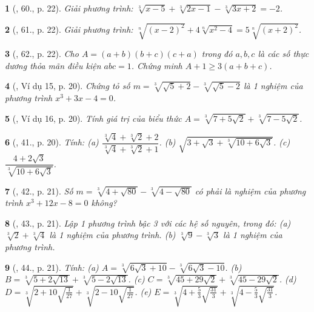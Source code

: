 \documentclass{article}
\newtheorem{baitoan}{}%
\begin{document}
\begin{baitoan}[\cite{Tuyen_Toan_9_old}, 60., p. 22]
	Giải phương trình: $\sqrt[3]{x - 5} + \sqrt[3]{2x - 1} - \sqrt[3]{3x + 2} = -2$.
\end{baitoan}

\begin{baitoan}[\cite{Tuyen_Toan_9_old}, 61., p. 22]
	Giải phương trình: $\sqrt[n]{(x - 2)^2} + 4\sqrt[n]{x^2 - 4} = 5\sqrt[n]{(x + 2)^2}$.
\end{baitoan}

\begin{baitoan}[\cite{Tuyen_Toan_9_old}, 62., p. 22]
	Cho $A = (a + b)(b + c)(c + a)$ trong đó $a,b,c$ là các số thực dương thỏa mãn điều kiện $abc = 1$. Chứng minh $A + 1\ge3(a + b + c)$.
\end{baitoan}

\begin{baitoan}[\cite{Binh_Toan_9_tap_1}, Ví dụ 15, p. 20]
	Chứng tỏ số $m = \sqrt[3]{\sqrt{5} + 2} - \sqrt[3]{\sqrt{5} - 2}$ là 1 nghiệm của phương trình $x^3 + 3x - 4 = 0$.
\end{baitoan}

\begin{baitoan}[\cite{Binh_Toan_9_tap_1}, Ví dụ 16, p. 20]
	Tính giá trị của biểu thức $A = \sqrt[3]{7 + 5\sqrt{2}} + \sqrt[3]{7 - 5\sqrt{2}}$.
\end{baitoan}

\begin{baitoan}[\cite{Binh_Toan_9_tap_1}, 41., p. 20]
	Tính: (a) $\dfrac{\sqrt[3]{4} + \sqrt[3]{2} + 2}{\sqrt[3]{4} + \sqrt[3]{2} + 1}$. (b) $\sqrt{3 + \sqrt{3} + \sqrt[3]{10 + 6\sqrt{3}}}$. (c) $\dfrac{4 + 2\sqrt{3}}{\sqrt[3]{10 + 6\sqrt{3}}}$.
\end{baitoan}

\begin{baitoan}[\cite{Binh_Toan_9_tap_1}, 42., p. 21]
	Số $m = \sqrt[3]{4 + \sqrt{80}} - \sqrt[3]{4 - \sqrt{80}}$ có phải là nghiệm của phương trình $x^3 + 12x - 8 = 0$ không?
\end{baitoan}

\begin{baitoan}[\cite{Binh_Toan_9_tap_1}, 43., p. 21]
	Lập 1 phương trình bậc 3 với các hệ số nguyên, trong đó: (a) $\sqrt[3]{2} + \sqrt[3]{4}$ là 1 nghiệm của phương trình. (b) $\sqrt[3]{9} - \sqrt[3]{3}$ là 1 nghiệm của phương trình.
\end{baitoan}

\begin{baitoan}[\cite{Binh_Toan_9_tap_1}, 44., p. 21]
	Tính: (a) $A = \sqrt[3]{6\sqrt{3} + 10} - \sqrt[3]{6\sqrt{3} - 10}$. (b) $B = \sqrt[3]{5 + 2\sqrt{13}} + \sqrt[3]{5 - 2\sqrt{13}}$. (c) $C = \sqrt[3]{45 + 29\sqrt{2}} + \sqrt[3]{45 - 29\sqrt{2}}$. (d) $D = \sqrt[3]{2 + 10\sqrt{\frac{1}{27}}} + \sqrt[3]{2 - 10\sqrt{\frac{1}{27}}}$. (e) $E = \sqrt[3]{4 + \frac{5}{3}\sqrt{\frac{31}{3}}} + \sqrt[3]{4 - \frac{5}{3}\sqrt{\frac{31}{3}}}$.
\end{baitoan}
\end{document}
